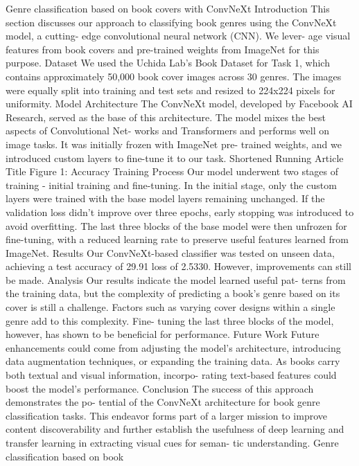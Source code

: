 Genre classification based on book
covers with ConvNeXt
Introduction
This section discusses our approach to classifying
book genres using the ConvNeXt model, a cutting-
edge convolutional neural network (CNN). We lever-
age visual features from book covers and pre-trained
weights from ImageNet for this purpose.
Dataset
We used the Uchida Lab’s Book Dataset for Task
1, which contains approximately 50,000 book cover
images across 30 genres. The images were equally
split into training and test sets and resized to 224x224
pixels for uniformity.
Model Architecture
The ConvNeXt model, developed by Facebook AI
Research, served as the base of this architecture. The
model mixes the best aspects of Convolutional Net-
works and Transformers and performs well on image
tasks. It was initially frozen with ImageNet pre-
trained weights, and we introduced custom layers to
fine-tune it to our task.
Shortened Running Article Title
Figure 1: Accuracy
Training Process
Our model underwent two stages of training - initial
training and fine-tuning. In the initial stage, only
the custom layers were trained with the base model
layers remaining unchanged. If the validation loss
didn’t improve over three epochs, early stopping
was introduced to avoid overfitting. The last three
blocks of the base model were then unfrozen for
fine-tuning, with a reduced learning rate to preserve
useful features learned from ImageNet.
Results
Our ConvNeXt-based classifier was tested on unseen
data, achieving a test accuracy of 29.91%
loss of 2.5330. However, improvements can still be
made.
Analysis
Our results indicate the model learned useful pat-
terns from the training data, but the complexity of
predicting a book’s genre based on its cover is still
a challenge. Factors such as varying cover designs
within a single genre add to this complexity. Fine-
tuning the last three blocks of the model, however,
has shown to be beneficial for performance.
Future Work
Future enhancements could come from adjusting the
model’s architecture, introducing data augmentation
techniques, or expanding the training data. As books
carry both textual and visual information, incorpo-
rating text-based features could boost the model’s
performance.
Conclusion
The success of this approach demonstrates the po-
tential of the ConvNeXt architecture for book genre
classification tasks. This endeavor forms part of a
larger mission to improve content discoverability and
further establish the usefulness of deep learning and
transfer learning in extracting visual cues for seman-
tic understanding.
Genre classification based on book
